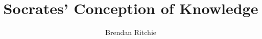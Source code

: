 ﻿\documentclass[11pt]{amsart}
\author{Brendan Ritchie}
\title{Socrates' Conception of Knowledge}
\begin{document}
\maketitle











\begin{comment}

COMMENTS FROM JON:

MAYBE BIT OF STUFF IN CONCLUSION COULD BE MOVED TO START

SPECIFIC:

p4: subject matter in extensional terms - maybe true but example doesn't really show it
	medicine examples not good etc...

p6: for right without success: should it be said that it makes the good outcome more successful

say more about the category theory example - seems important and underdeveloped....

maybe theory or concept - worry is about what he could have explicit

more in the way of a stalking horse or stalking horses

\end{comment}















\end{document}
